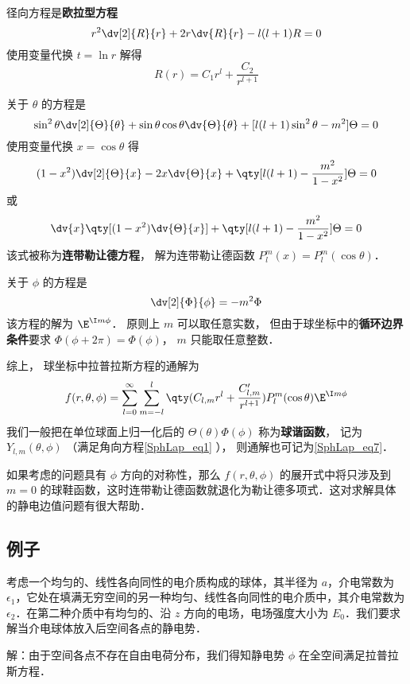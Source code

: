 径向方程是\textbf{欧拉型方程}
\begin{equation}
r^2\dv[2]{R}{r} + 2r\dv{R}{r} - l(l+1)R = 0
\end{equation}
使用变量代换 $t = \ln r$ 解得
\begin{equation}
R(r) = C_1 r^l + \frac{C_2}{r^{l+1}}
\end{equation}

关于 $\theta$ 的方程是
\begin{equation}
\sin^2\theta \dv[2]{\Theta}{\theta} + \sin\theta\cos\theta\dv{\Theta}{\theta} + [l(l+1)\sin^2\theta - m^2] \Theta = 0
\end{equation}
使用变量代换 $x = \cos\theta$ 得
\begin{equation}
(1-x^2)\dv[2]{\Theta}{x} - 2x\dv{\Theta}{x} + \qty[l(l+1) - \frac{m^2}{1-x^2}]\Theta = 0
\end{equation}
或
\begin{equation}
\dv{x} \qty[(1-x^2)\dv{\Theta}{x}] + \qty[l(l+1) - \frac{m^2}{1-x^2}]\Theta = 0
\end{equation}
该式被称为\textbf{连带勒让德方程}， 解为连带勒让德函数 $P_l^m(x) = P_l^m(\cos\theta)$．

关于 $\phi$ 的方程是
\begin{equation}
\dv[2]{\Phi}{\phi} = -m^2 \Phi
\end{equation}
该方程的解为 $\E^{\I m\phi}$． 原则上 $m$ 可以取任意实数， 但由于球坐标中的\textbf{循环边界条件}要求 $\Phi(\phi + 2\pi) = \Phi(\phi)$， $m$ 只能取任意整数．

综上， 球坐标中拉普拉斯方程的通解为
\begin{equation}\label{SphLap_eq6}
f(r, \theta, \phi) = \sum_{l = 0}^\infty \sum_{m = -l}^l \qty(C_{l,m} r^l + \frac{C'_{l,m}}{r^{l+1}})P_l^m(\cos\theta)\E^{\I m\phi}
\end{equation}
我们一般把在单位球面上归一化后的 $\Theta(\theta)\Phi(\phi)$ 称为\textbf{球谐函数}， 记为 $Y_{l,m}(\theta,\phi)$ （满足角向方程\autoref{SphLap_eq1} ）， 则通解也可记为\autoref{SphLap_eq7}．

如果考虑的问题具有 $\phi$ 方向的对称性，那么 $f(r,\theta,\phi)$ 的展开式中将只涉及到 $m=0$ 的球鞋函数，这时连带勒让德函数就退化为勒让德多项式．这对求解具体的静电边值问题有很大帮助．

\subsection{例子}

考虑一个均匀的、线性各向同性的电介质构成的球体，其半径为 $a$，介电常数为 $\epsilon_1$，它处在填满无穷空间的另一种均匀、线性各向同性的电介质中，其介电常数为 $\epsilon_2$．在第二种介质中有均匀的、沿 $z$ 方向的电场，电场强度大小为 $E_0$．我们要求解当介电球体放入后空间各点的静电势．

解：由于空间各点不存在自由电荷分布，我们得知静电势 $\phi$ 在全空间满足拉普拉斯方程．